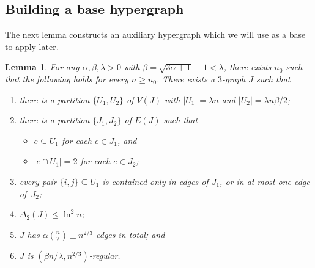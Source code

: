 \documentclass[a4paper, 11pt,reqno]{amsart}
\theoremstyle{plain}
\newtheorem{lemma}[theorem]{Lemma}
\theoremstyle{definition}
\numberwithin{equation}{section}
\begin{document}


\subsection{Building a base hypergraph}

The next lemma constructs an auxiliary hypergraph which we will 
use as a base to apply  later.

\begin{lemma} \label{lemma:basehypergraph}
	For any $\alpha, \beta, \lambda > 0$ with $\beta = \sqrt{3 \alpha + 1} - 1 < \lambda$, 
	there exists $n_0$ such that the following holds for every $n \geq n_0$.  
	There exists a $3$-graph $J$ such that
	\begin{enumerate}[label=\upshape{\textbf{(J\arabic*)}},labelindent=0pt,labelwidth=\widthof{\ref{item:J-regular}},leftmargin=!]
		\item \label{item:J-vpartition} there is a partition $\{U_1, U_2\}$
		of $V(J)$ with $|U_1| = \lambda n$ and ${|U_2| = \lambda n \beta / 2}$;
		\item \label{item:J-2or3}there is a partition $\{J_1, J_2\}$ of $E(J)$ such that
		\begin{itemize}
			\item $e \subseteq U_1$ for each $e \in J_1$, and
			\item $|e \cap U_1| = 2$ for each $e \in J_2$;
		\end{itemize}
		\item \label{item:J-antichain} every pair $\{i,j\} \subseteq U_1$ is
		contained only in edges of $J_1$, or in at most one edge of~$J_2$;
		\item \label{item:J-codegree} $\Delta_2(J) \leq \ln^2 n$;
		\item \label{item:J-totalnumber} $J$ has $\alpha \binom{n}{2} \pm
		n^{2/3}$ edges in total; and
		\item \label{item:J-regular} $J$ is $(\beta n / \lambda, n^{2/3})$-regular.
	\end{enumerate}
\end{lemma}
\end{document}
